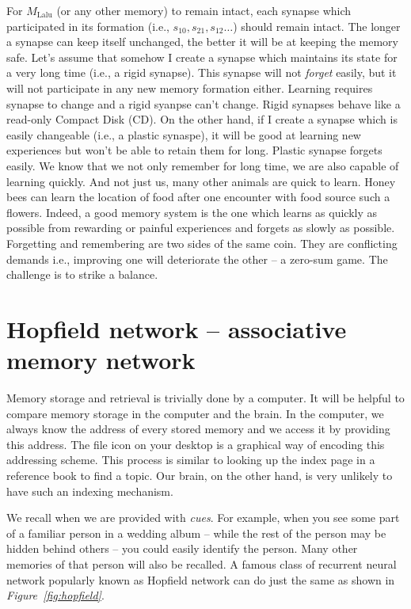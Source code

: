 \documentclass[]{resonance}
\newcommand\Fig[1]{\textit{Figure~\ref{#1}}}
\begin{document}
For $M_\text{Lalu}$ (or any other memory) to remain intact, each synapse which
participated in its formation (i.e., $s_{10}, s_{21}, s_{12} \ldots$) should
remain intact. The longer a synapse can keep itself unchanged, the better it
will be at keeping the memory safe. Let's assume that somehow I create a synapse
which maintains its state for a very long time (i.e., a rigid synapse). This
synapse will not \emph{forget} easily, but it will not participate in any new
memory formation either. Learning requires synapse to change and a rigid syanpse
can't change.  Rigid synapses behave like a read-only Compact Disk (CD). On the
other hand, if I create a synapse which is easily changeable (i.e., a plastic
synaspe), it will be good at learning new experiences but won't be able to
retain them for long. Plastic synapse forgets easily.  We know that we not only
remember for long time, we are also capable of learning quickly. And not just
us, many other animals are quick to learn. Honey bees can learn the location of
food after one encounter with food source such a flowers. Indeed, a good memory
system is the one which learns as quickly as possible from rewarding or painful
experiences and forgets as slowly as possible. Forgetting and remembering are
two sides of the same coin. They are conflicting demands i.e., improving one
will deteriorate the other -- a zero-sum game.  The challenge is to strike a
balance. 

\section{Hopfield network -- associative memory network}\label{sec:hopfield}

Memory storage and retrieval is trivially done by a computer. It will be helpful
to compare memory storage in the computer and the brain. In the computer, we
always know the address of every stored memory and we access it by providing
this address. The file icon on your desktop is a graphical way of encoding this
addressing scheme. This process is similar to looking up the index page in a
reference book to find a topic. Our brain, on the other hand, is very unlikely
to have such an indexing mechanism. 

We recall when we are provided with \textit{cues}. For example, when you see
some part of a familiar person in a wedding album -- while the rest of the
person may be hidden behind others -- you could easily identify the person.
Many other memories of that person will also be recalled. A famous class of
recurrent neural network popularly known as Hopfield network can do just the
same as shown in \Fig{fig:hopfield}.
\end{document}
